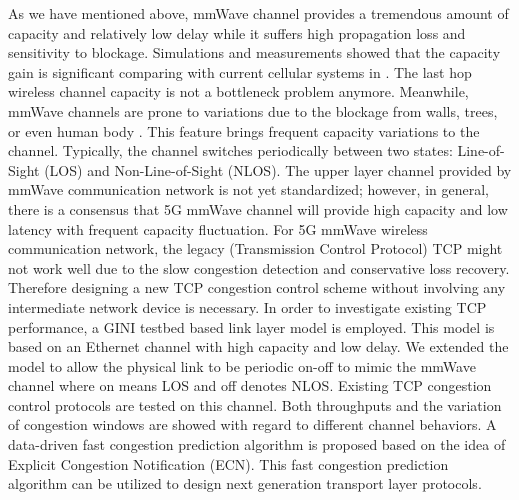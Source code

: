 \par As we have mentioned above, mmWave channel provides a tremendous amount of capacity and relatively low delay while it suffers high propagation loss and sensitivity to blockage. Simulations and measurements showed that the capacity gain is significant comparing with current cellular systems in \cite{akdeniz2014millimeter,bai2015coverage}. The last hop wireless channel capacity is not a bottleneck problem anymore. Meanwhile, mmWave channels are prone to variations due to the blockage from walls, trees, or even human body \cite{lu2012modeling, zhao201328, alejos2008measurement}. This feature brings frequent capacity variations to the channel. Typically, the channel switches periodically between two states: Line-of-Sight (LOS) and Non-Line-of-Sight (NLOS). The upper layer channel provided by mmWave communication network is not yet standardized; however, in general, there is a consensus that 5G mmWave channel will provide high capacity and low latency with frequent capacity fluctuation. For 5G mmWave wireless communication network, the legacy (Transmission Control Protocol) TCP might not work well due to the slow congestion detection and conservative loss recovery. Therefore designing a new TCP congestion control scheme without involving any intermediate network device is necessary. In order to investigate existing TCP performance, a GINI testbed based link layer model is employed. This model is based on an Ethernet channel with high capacity and low delay. We extended the model to allow the physical link to be periodic on-off to mimic the mmWave channel where on means LOS and off denotes NLOS. Existing TCP congestion control protocols are tested on this channel. Both throughputs and the variation of congestion windows are showed with regard to different channel behaviors. A data-driven fast congestion prediction algorithm is proposed based on the idea of Explicit Congestion Notification (ECN). This fast congestion prediction algorithm can be utilized to design next generation transport layer protocols.
